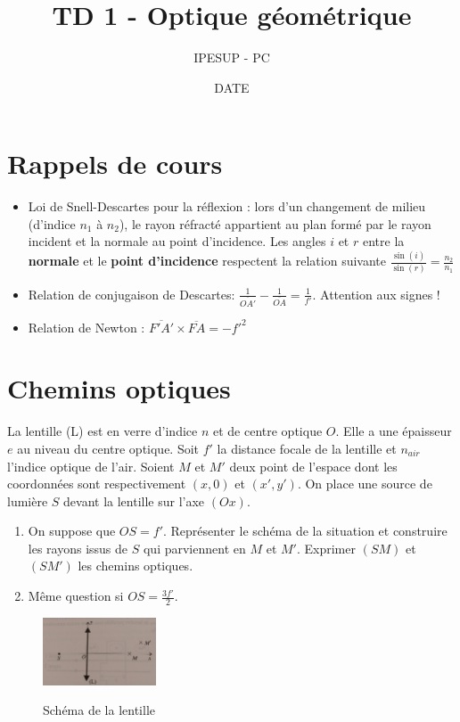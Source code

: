 \documentclass{article}
\title{TD 1 - Optique géométrique }
\author{IPESUP - PC }
\date{DATE }
\begin{document}
\maketitle



\section{Rappels de cours}

\begin{itemize}
  \item Loi de Snell-Descartes pour la réflexion : lors d'un changement de milieu (d'indice $n_1$ à $n_2$), le rayon réfracté appartient au plan formé par le rayon incident et la normale au point d'incidence. Les angles $i$ et $r$ entre la \textbf{normale} et le \textbf{point d'incidence} respectent la relation suivante $\frac{\sin(i)}{\sin(r)} = \frac{n_2}{n_1}$
  \item Relation de conjugaison de Descartes: $\frac{1}{\overline{OA'} } - \frac{1}{\overline{OA} } = \frac{1}{f'}$. Attention aux signes ! 
  \item Relation de Newton : $\overline{F'A'} \times \overline{FA} = -f'^2$
\end{itemize}
\section{Chemins optiques}

La lentille (L) est en verre d'indice $n$ et de centre optique $O$.
Elle a une épaisseur $e$ au niveau du centre optique. 
Soit $f'$ la distance focale de la lentille et $n_{air}$ l'indice optique de l'air.
Soient $M$ et $M'$ deux point de l'espace dont les coordonnées sont respectivement $(x,0)$ et $(x',y')$.
On place une source de lumière $S$ devant la lentille sur l'axe $(Ox)$. 
\begin{enumerate}
  \item On suppose que $OS=f'$. Représenter le schéma de la situation et construire les rayons issus de $S$ qui parviennent en $M$ et $M'$. Exprimer $(SM)$ et $(SM')$ les chemins optiques. 
  \item Même question si $OS=\frac{3f'}{2}$.
\end{enumerate}




\begin{figure}[h]
  \centering
  \includegraphics[width=0.3\textwidth]{exercice 1.jpg}
  \label{fig:ex}
    \caption{Schéma de la lentille}
\end{figure}
\end{document}
